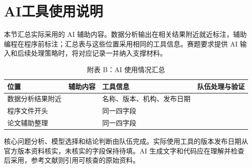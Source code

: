 \clearpage
\section*{AI工具使用说明}
本节汇总实际采用的 AI 辅助内容。数据分析输出在相关结果附近就近标注，辅助编程在程序前标注；汇总表与这些位置采用相同的工具信息。赛题要求提供 AI 输入和后续处理策略时，将对应记录一并纳入支撑材料。
\begin{table}[H]\centering\caption*{附表 B：AI 使用情况汇总}
\begin{tabularx}{\linewidth}{lYYY}\toprule
位置 & 辅助内容 & 工具信息 & 队伍处理与验证\\\midrule
数据分析结果附近 &  & 名称、版本、机构、发布日期 & \\
程序文件开头 &  & 同一四字段 & \\
论文辅助整理 &  & 同一四字段 & \\\bottomrule
\end{tabularx}\end{table}
核心问题分析、模型选择和结论判断由队伍完成。实际使用工具的版本发布日期从官方版本资料核实，未核实的字段保持待填。AI 生成文字和代码应在理解并检查后采用，参考文献则引用可核查的原始资料。
